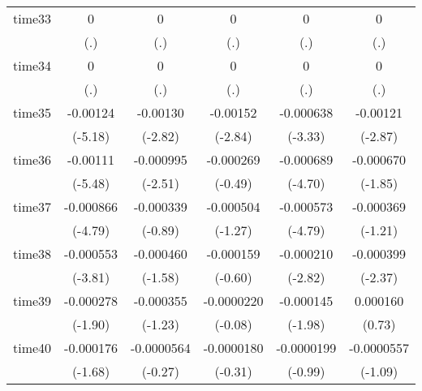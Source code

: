 \begin{table}[htbp]
\begin{tabular}{l*{5}{c}}
time33      &           0         &           0         &           0         &           0         &           0         \\
            &         (.)         &         (.)         &         (.)         &         (.)         &         (.)         \\
time34      &           0         &           0         &           0         &           0         &           0         \\
            &         (.)         &         (.)         &         (.)         &         (.)         &         (.)         \\
time35      &    -0.00124\sym{***}&    -0.00130\sym{**} &    -0.00152\sym{**} &   -0.000638\sym{***}&    -0.00121\sym{**} \\
            &     (-5.18)         &     (-2.82)         &     (-2.84)         &     (-3.33)         &     (-2.87)         \\
time36      &    -0.00111\sym{***}&   -0.000995\sym{*}  &   -0.000269         &   -0.000689\sym{***}&   -0.000670         \\
            &     (-5.48)         &     (-2.51)         &     (-0.49)         &     (-4.70)         &     (-1.85)         \\
time37      &   -0.000866\sym{***}&   -0.000339         &   -0.000504         &   -0.000573\sym{***}&   -0.000369         \\
            &     (-4.79)         &     (-0.89)         &     (-1.27)         &     (-4.79)         &     (-1.21)         \\
time38      &   -0.000553\sym{***}&   -0.000460         &   -0.000159         &   -0.000210\sym{**} &   -0.000399\sym{*}  \\
            &     (-3.81)         &     (-1.58)         &     (-0.60)         &     (-2.82)         &     (-2.37)         \\
time39      &   -0.000278         &   -0.000355         &  -0.0000220         &   -0.000145\sym{*}  &    0.000160         \\
            &     (-1.90)         &     (-1.23)         &     (-0.08)         &     (-1.98)         &      (0.73)         \\
time40      &   -0.000176         &  -0.0000564         &  -0.0000180         &  -0.0000199         &  -0.0000557         \\
            &     (-1.68)         &     (-0.27)         &     (-0.31)         &     (-0.99)         &     (-1.09)         \\

\end{tabular}
\end{table}
